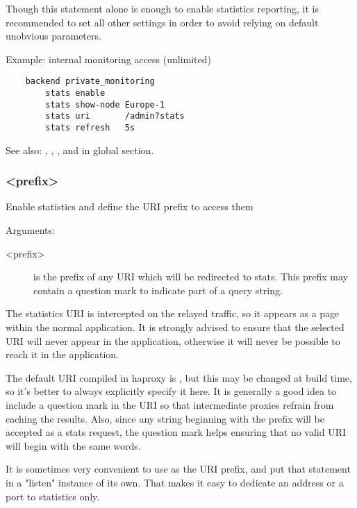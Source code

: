 {  Though this statement alone is enough to enable statistics reporting, it is
  recommended to set all other settings in order to avoid relying on default
  unobvious parameters.

  Example: internal monitoring access (unlimited)
  \begin{verbatim}
    backend private_monitoring
        stats enable
        stats show-node Europe-1
        stats uri       /admin?stats
        stats refresh   5s
  \end{verbatim}

  See also: , , , and  in global
            section.

\subsubsection[stats uri]{ <prefix>}


  Enable statistics and define the URI prefix to access them


  Arguments:
  \begin{description}
  \item[<prefix>] is the prefix of any URI which will be redirected to stats. This
              prefix may contain a question mark  to indicate part of a
              query string.
  \end{description}

  The statistics URI is intercepted on the relayed traffic, so it appears as a
  page within the normal application. It is strongly advised to ensure that the
  selected URI will never appear in the application, otherwise it will never be
  possible to reach it in the application.

  The default URI compiled in haproxy is , but this may be
  changed at build time, so it's better to always explicitly specify it here.
  It is generally a good idea to include a question mark in the URI so that
  intermediate proxies refrain from caching the results. Also, since any string
  beginning with the prefix will be accepted as a stats request, the question
  mark helps ensuring that no valid URI will begin with the same words.

  It is sometimes very convenient to use \chr{/} as the URI prefix, and put that
  statement in a "listen" instance of its own. That makes it easy to dedicate
  an address or a port to statistics only.

}
